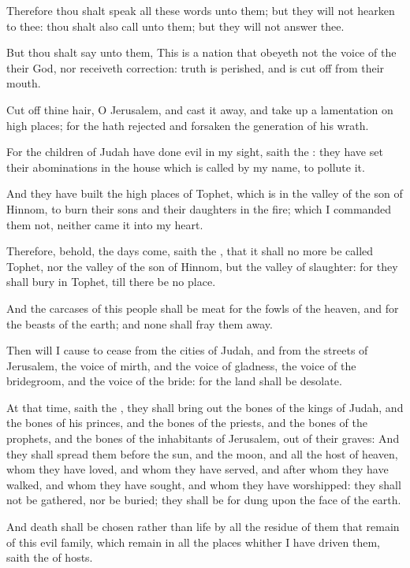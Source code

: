 \Verse Therefore thou shalt speak all these words unto them; but they will not hearken to thee: thou shalt also call unto them; but they will not answer thee.

\Verse But thou shalt say unto them, This is a nation that obeyeth not the voice of the \LORD their God, nor receiveth correction: truth is perished, and is cut off from their mouth.

\Verse Cut off thine hair, O Jerusalem, and cast it away, and take up a lamentation on high places; for the \LORD hath rejected and forsaken the generation of his wrath.

\Verse For the children of Judah have done evil in my sight, saith the \LORD: they have set their abominations in the house which is called by my name, to pollute it.

\Verse And they have built the high places of Tophet, which is in the valley of the son of Hinnom, to burn their sons and their daughters in the fire; which I commanded them not, neither came it into my heart.

\Verse Therefore, behold, the days come, saith the \LORD, that it shall no more be called Tophet, nor the valley of the son of Hinnom, but the valley of slaughter: for they shall bury in Tophet, till there be no place.

\Verse And the carcases of this people shall be meat for the fowls of the heaven, and for the beasts of the earth; and none shall fray them away.

\Verse Then will I cause to cease from the cities of Judah, and from the streets of Jerusalem, the voice of mirth, and the voice of gladness, the voice of the bridegroom, and the voice of the bride: for the land shall be desolate.


\Chapter
\Verse At that time, saith the \LORD, they shall bring out the bones of the kings of Judah, and the bones of his princes, and the bones of the priests, and the bones of the prophets, and the bones of the inhabitants of Jerusalem, out of their graves: \Verse And they shall spread them before the sun, and the moon, and all the host of heaven, whom they have loved, and whom they have served, and after whom they have walked, and whom they have sought, and whom they have worshipped: they shall not be gathered, nor be buried; they shall be for dung upon the face of the earth.

\Verse And death shall be chosen rather than life by all the residue of them that remain of this evil family, which remain in all the places whither I have driven them, saith the \LORD of hosts.

